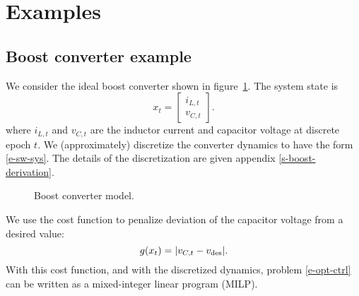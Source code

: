 \documentclass[12pt]{article}
\begin{document}
\section{Examples}
\label{s-examples}

\subsection{Boost converter example}




\label{s-boost-example}
We consider the ideal boost converter shown in figure~\ref{f-boost}.
The system state is
\[
x_t =
\begin{bmatrix} i_{L,t} \\ v_{C,t} \end{bmatrix}.
\]
where $i_{L,t}$ and $v_{C,t}$ are the inductor current and capacitor
voltage at discrete epoch $t$.
We (approximately) discretize the converter dynamics
to have the form \eqref{e-sw-sys}.
The details of the discretization are given appendix \ref{s-boost-derivation}.

\begin{figure}
\centering
{}
\caption{
Boost converter model.
}
\label{f-boost}
\end{figure}




We use the cost function to 
penalize deviation of the capacitor voltage from a desired value:
\[
g(x_t) = |v_{C,t} - v_{\rm des}|.
\]
With this cost function, 
and with the discretized dynamics, problem \eqref{e-opt-ctrl}  can be written as a mixed-integer linear program (MILP).
\end{document}
